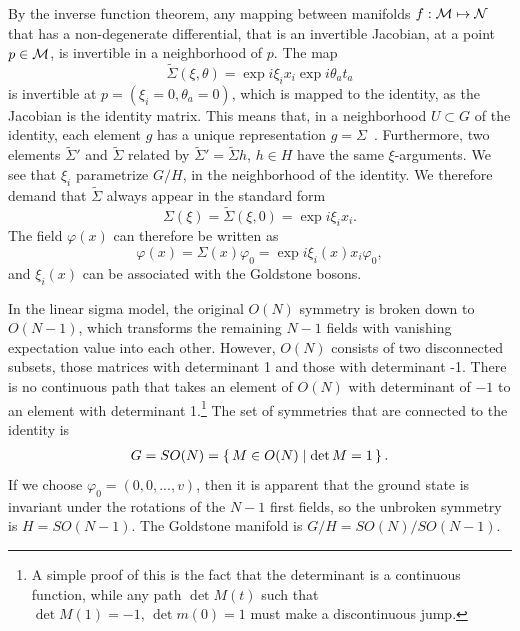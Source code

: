 By the inverse function theorem, any mapping between manifolds $f: \mathcal{M} \mapsto \mathcal{N}$ that has a non-degenerate differential, that is an invertible Jacobian, at a point $p \in \mathcal{M}$, is invertible in a neighborhood of $p$.
The map
\begin{equation}
    \tilde \Sigma(\xi, \theta) = \exp{i \xi_i x_i} \exp{i \theta_a t_a}
\end{equation}
is invertible at $p = (\xi_i = 0, \theta_a = 0)$, which is mapped to the identity, as the Jacobian is the identity matrix.
This means that, in a neighborhood $U \subset G$ of the identity, each element $g$ has a unique representation $g = \Sigma$~\cite{smooth_manifolds}.
Furthermore, two elements $\tilde \Sigma'$ and $\tilde \Sigma$ related by $\tilde \Sigma' = \tilde \Sigma h$, $h \in H$ have the same $\xi$-arguments.
We see that $\xi_i$ parametrize $G/H$, in the neighborhood of the identity.
We therefore demand that $\tilde \Sigma$ always appear in the standard form
\begin{equation}
    \Sigma(\xi) = \tilde \Sigma(\xi, 0) = \exp{i \xi_i x_i}.
\end{equation}
The field $\varphi(x)$ can therefore be written as
\begin{equation}
    \varphi(x) = \Sigma(x) \varphi_0 = \exp{i \xi_i(x) x_i} \varphi_0,
\end{equation}
and $\xi_i(x)$ can be associated with the Goldstone bosons.

In the linear sigma model, the original $O(N)$ symmetry is broken down to $O(N-1)$, which transforms the remaining $N-1$ fields with vanishing expectation value into each other.
However, $O(N)$ consists of two disconnected subsets, those matrices with determinant 1 and those with determinant -1.
There is no continuous path that takes an element of $O(N)$ with determinant of $-1$ to an element with determinant 1.\footnote{A simple proof of this is the fact that the determinant is a continuous function, while any path $\det M(t)$ such that $\det M(1) = -1,\, \det m(0) = 1$ must make a discontinuous jump.}
The set of symmetries that are connected to the identity is
\begin{eqnarray}
    G = SO(N) = \left\{\, M \in O(N) \mid  \det M = 1 \,\right\}.
\end{eqnarray}
If we choose $\varphi_0 = (0, 0, ..., v)$, then it is apparent that the ground state is invariant under the rotations of the $N-1$ first fields, so the unbroken symmetry is  $H = SO(N-1)$.
The Goldstone manifold is $G/H = SO(N) / SO(N-1)$.

